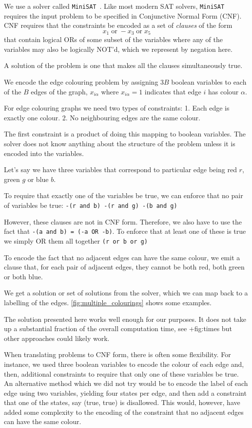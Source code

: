 We use a solver called \texttt{MiniSAT}~\autocite{imms-sat18}. Like most modern SAT solvers, \texttt{MiniSAT} requires the input problem to be specified in Conjunctive Normal Form (CNF). CNF requires that the constraints be encoded as a set of \emph{clauses} of the form \[x_1 \;\textrm{or}\; -x_3 \;\textrm{or}\; x_5\] that contain logical ORs of some subset of the variables where any of the variables may also be logically NOT'd, which we represent by negation here.

A solution of the problem is one that makes all the clauses simultaneously true.

We encode the edge colouring problem by assigning \(3B\) boolean variables to each of the \(B\) edges of the graph, \(x_{i\alpha}\) where \(x_{i\alpha} = 1\) indicates that edge \(i\) has colour \(\alpha\).

For edge colouring graphs we need two types of constraints: 1. Each edge is exactly one colour. 2. No neighbouring edges are the same colour.

The first constraint is a product of doing this mapping to boolean variables. The solver does not know anything about the structure of the problem unless it is encoded into the variables.

Let's say we have three variables that correspond to particular edge being red \(r\), green \(g\) or blue \(b\).

To require that exactly one of the variables be true, we can enforce that no pair of variables be true: \texttt{-(r\ and\ b)\ -(r\ and\ g)\ -(b\ and\ g)}

However, these clauses are not in CNF form. Therefore, we also have to use the fact that \texttt{-(a\ and\ b)\ =\ (-a\ OR\ -b)}. To enforce that at least one of these is true we simply OR them all together \texttt{(r\ or\ b\ or\ g)}

To encode the fact that no adjacent edges can have the same colour, we emit a clause that, for each pair of adjacent edges, they cannot be both red, both green or both blue.

We get a solution or set of solutions from the solver, which we can map back to a labelling of the edges. \cref{fig:multiple_colourings} shows some examples.

The solution presented here works well enough for our purposes. It does not take up a substantial fraction of the overall computation time, see +fig:times but other approaches could likely work.

When translating problems to CNF form, there is often some flexibility. For instance, we used three boolean variables to encode the colour of each edge and, then, additional constraints to require that only one of these variables be true. An alternative method which we did not try would be to encode the label of each edge using two variables, yielding four states per edge, and then add a constraint that one of the states, say (true, true) is disallowed. This would, however, have added some complexity to the encoding of the constraint that no adjacent edges can have the same colour.

